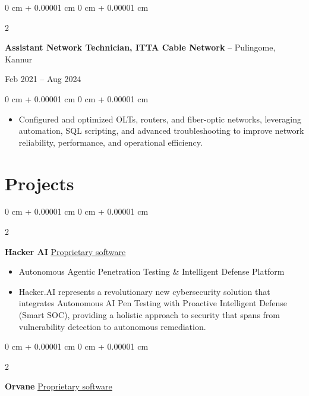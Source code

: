 \documentclass[10pt, a4paper]{article}
\newenvironment{highlights}{
    \begin{itemize}[
        topsep=0.10 cm,
        parsep=0.10 cm,
        partopsep=0pt,
        itemsep=0pt,
        leftmargin=0 cm + 10pt
    ]
}{
    \end{itemize}
} %
\newenvironment{onecolentry}{
    \begin{adjustwidth}{
        0 cm + 0.00001 cm
    }{
        0 cm + 0.00001 cm
    }
}{
    \end{adjustwidth}
} %
\newenvironment{twocolentry}[2][]{
    \onecolentry
    \def\secondColumn{#2}
    \setcolumnwidth{\fill, 4.5 cm}
    \begin{paracol}{2}
}{
    \switchcolumn \raggedleft \secondColumn
    \end{paracol}
    \endonecolentry
} %
\begin{document}
    \vspace{0.2 cm}

\begin{twocolentry}{
    Feb 2021 – Aug 2024
}
    \textbf{Assistant Network Technician, ITTA Cable Network} -- Pulingome, Kannur
\end{twocolentry}

\vspace{0.10 cm}
\begin{onecolentry}
    \begin{highlights}
        \item Configured and optimized OLTs, routers, and fiber-optic networks, leveraging automation, SQL scripting, and advanced troubleshooting to improve network reliability, performance, and operational efficiency.
    \end{highlights}
\end{onecolentry}

    \section{Projects}

            \begin{twocolentry}{
            \href{https://github.com/TimsTittus/Hacker-AI}{\underline{Proprietary software}}
        }
            \textbf{Hacker AI}\end{twocolentry}

        \vspace{0.01 cm}
        
            \begin{highlights}
                \item Autonomous Agentic Penetration Testing \& Intelligent Defense Platform
                \item Hacker.AI represents a revolutionary new cybersecurity solution that integrates Autonomous AI Pen Testing with Proactive Intelligent Defense (Smart SOC), providing a holistic approach to security that spans from vulnerability detection to autonomous remediation.
            \end{highlights}

        \vspace{0.01 cm}
            
            \begin{twocolentry}{
            \href{https://github.com/TimsTittus/Orvane}{\underline{Proprietary software}}
        }
            \textbf{Orvane}\end{twocolentry}
\end{document}
